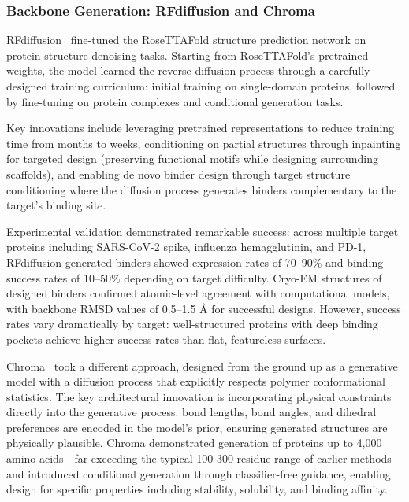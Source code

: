 \subsubsection{Backbone Generation: RFdiffusion and Chroma}

RFdiffusion~\citep{watson2023rfdiffusion} fine-tuned the RoseTTAFold structure prediction network on protein structure denoising tasks. Starting from RoseTTAFold's pretrained weights, the model learned the reverse diffusion process through a carefully designed training curriculum: initial training on single-domain proteins, followed by fine-tuning on protein complexes and conditional generation tasks. 

Key innovations include leveraging pretrained representations to reduce training time from months to weeks, conditioning on partial structures through inpainting for targeted design (preserving functional motifs while designing surrounding scaffolds), and enabling de novo binder design through target structure conditioning where the diffusion process generates binders complementary to the target's binding site.

Experimental validation demonstrated remarkable success: across multiple target proteins including SARS-CoV-2 spike, influenza hemagglutinin, and PD-1, RFdiffusion-generated binders showed expression rates of 70--90\% and binding success rates of 10--50\% depending on target difficulty. Cryo-EM structures of designed binders confirmed atomic-level agreement with computational models, with backbone RMSD values of 0.5--1.5 \AA{} for successful designs. However, success rates vary dramatically by target: well-structured proteins with deep binding pockets achieve higher success rates than flat, featureless surfaces.

Chroma~\citep{ingraham2023chroma} took a different approach, designed from the ground up as a generative model with a diffusion process that explicitly respects polymer conformational statistics. The key architectural innovation is incorporating physical constraints directly into the generative process: bond lengths, bond angles, and dihedral preferences are encoded in the model's prior, ensuring generated structures are physically plausible. Chroma demonstrated generation of proteins up to 4,000 amino acids---far exceeding the typical 100-300 residue range of earlier methods---and introduced conditional generation through classifier-free guidance, enabling design for specific properties including stability, solubility, and binding affinity.

